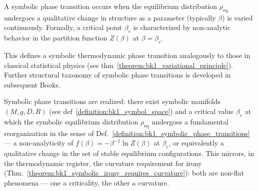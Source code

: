 \begin{definition}
\label{definition:bk1_symbolic_phase_transitions}
A symbolic phase transition occurs when the equilibrium distribution $\rho_{\text{eq}}$ undergoes a qualitative change in structure as a parameter (typically $\beta$) is varied continuously. Formally, a critical point $\beta_c$ is characterized by non-analytic behavior in the partition function $Z(\beta)$ at $\beta = \beta_c$.

This defines a symbolic thermodynamic phase transition analogously to those in classical statistical physics (see thm~\ref{theorem:bk1_variational_principle}). Further structural taxonomy of symbolic phase transitions is developed in subsequent Books.
\end{definition}
\begin{theorem}
\label{theorem:bk1_realization_of_symbolic_phase_transitions}
Symbolic phase transitions are realized: there exist symbolic manifolds $(M, g, D, R)$ (see def~\ref{definition:bk1_symbol_space}) and a critical value $\beta_c$ at which the symbolic equilibrium distribution $\rho_{\text{eq}}$ undergoes a fundamental reorganization in the sense of Def.~\ref{definition:bk1_symbolic_phase_transitions} --- a non-analyticity of $f(\beta) = -\beta^{-1}\ln Z(\beta)$ at $\beta_c$, or equivalently a qualitative change in the set of stable equilibrium configurations. This mirrors, in the thermodynamic register, the curvature requirement for irony (Thm.~\ref{theorem:bk1_symbolic_irony_requires_curvature}): both are non-flat phenomena --- one a criticality, the other a curvature.
\end{theorem}
